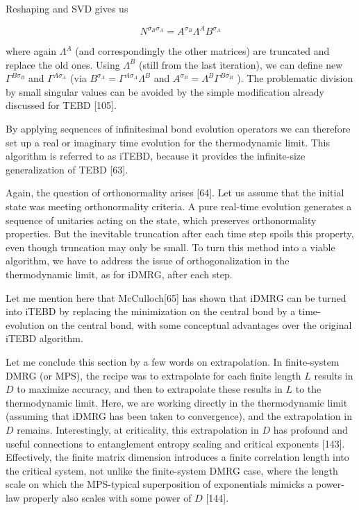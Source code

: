 \documentclass[12pt]{article}
\begin{document}
Reshaping and SVD gives us


\begin{equation*}
N^{\sigma_{B} \sigma_{A}}=A^{\sigma_{B}} \Lambda^{A} B^{\sigma_{A}} \tag{348}
\end{equation*}


where again $\Lambda^{A}$ (and correspondingly the other matrices) are truncated and replace the old ones. Using $\Lambda^{B}$ (still from the last iteration), we can define new $\Gamma^{B \sigma_{B}}$ and $\Gamma^{A \sigma_{A}}$ (via $B^{\sigma_{A}}=\Gamma^{A \sigma_{A}} \Lambda^{B}$ and $A^{\sigma_{B}}=\Lambda^{B} \Gamma^{B \sigma_{B}}$ ). The problematic division by small singular values can be avoided by the simple modification already discussed for TEBD [105].

By applying sequences of infinitesimal bond evolution operators we can therefore set up a real or imaginary time evolution for the thermodynamic limit. This algorithm is referred to as iTEBD, because it provides the infinite-size generalization of TEBD [63].

Again, the question of orthonormality arises [64]. Let us assume that the initial state was meeting orthonormality criteria. A pure real-time evolution generates a sequence of unitaries acting on the state, which preserves orthonormality properties. But the inevitable truncation after each time step spoils this property, even though truncation may only be small. To turn this method into a viable algorithm, we have to address the issue of orthogonalization in the thermodynamic limit, as for iDMRG, after each step.

Let me mention here that McCulloch[65] has shown that iDMRG can be turned into iTEBD by replacing the minimization on the central bond by a time-evolution on the central bond, with some conceptual advantages over the original iTEBD algorithm.

Let me conclude this section by a few words on extrapolation. In finite-system DMRG (or MPS), the recipe was to extrapolate for each finite length $L$ results in $D$ to maximize accuracy, and then to extrapolate these results in $L$ to the thermodynamic limit. Here, we are working directly in the thermodynamic limit (assuming that iDMRG has been taken to convergence), and the extrapolation in $D$ remains. Interestingly, at criticality, this extrapolation in $D$ has profound and useful connections to entanglement entropy scaling and critical exponents [143]. Effectively, the finite matrix dimension introduces a finite correlation length into the critical system, not unlike the finite-system DMRG case, where the length scale on which the MPS-typical superposition of exponentials mimicks a power-law properly also scales with some power of $D$ [144].
\end{document}
